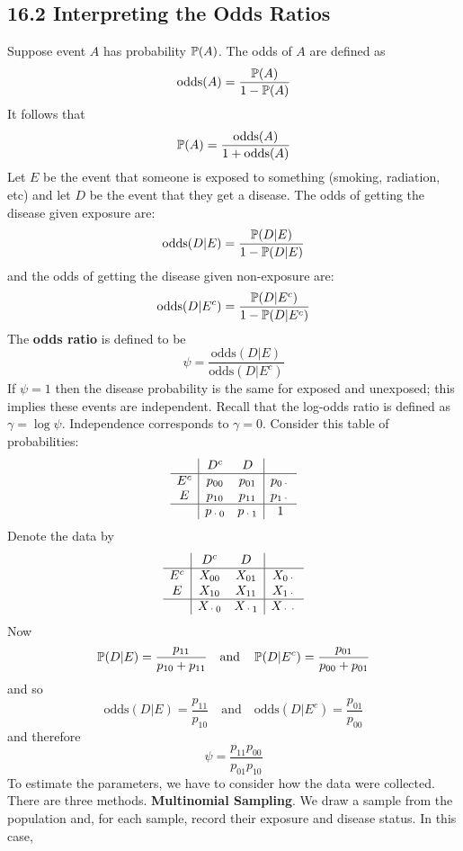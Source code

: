 \subsection*{16.2 Interpreting the Odds
Ratios}\label{interpreting-the-odds-ratios}
Suppose event \(A\) has probability \(\operatorname{\mathbb{P}}(A)\). The odds of \(A\)
are defined as
\[
\text{odds}(A) = \frac{\operatorname{\mathbb{P}}(A)}{1 - \operatorname{\mathbb{P}}(A)}
\]
It follows that
\[
\operatorname{\mathbb{P}}(A) = \frac{\text{odds}(A)}{1 + \text{odds}(A)}
\]
Let \(E\) be the event that someone is exposed to something (smoking,
radiation, etc) and let \(D\) be the event that they get a disease. The
odds of getting the disease given exposure are:
\[
\text{odds}(D | E) = \frac{\operatorname{\mathbb{P}}(D | E)}{1 - \operatorname{\mathbb{P}}(D | E)}
\]
and the odds of getting the disease given non-exposure are:
\[
\text{odds}(D | E^{c}) = \frac{\operatorname{\mathbb{P}}(D | E^{c})}{1 - \operatorname{\mathbb{P}}(D | E^{c})}
\]
The \textbf{odds ratio} is defined to be
\[
\psi = \frac{\text{odds}(D | E)}{\text{odds}(D | E^{c})}
\]
If \(\psi = 1\) then the disease probability is the same for exposed and
unexposed; this implies these events are independent. Recall that the
log-odds ratio is defined as \(\gamma = \log \psi\). Independence
corresponds to \(\gamma = 0\).
Consider this table of probabilities:
\[
\begin{array}{c|cc|c} 
      & D^{c}    & D      & \\
\hline
E^{c}   & p_{00} & p_{01} & p_{0\text{·}}\\
E     & p_{10} & p_{11} & p_{1\text{·}}\\
 \hline
      & p_{\text{·}0} & p_{\text{·}1} & 1
\end{array}
\]
Denote the data by
\[
\begin{array}{c|cc|c} 
      & D^{c}    & D      & \\
\hline
E^{c}   & X_{00} & X_{01} & X_{0\text{·}}\\
E     & X_{10} & X_{11} & X_{1\text{·}}\\
 \hline
      & X_{\text{·}0} & X_{\text{·}1} & X_{\text{··}}
\end{array}
\]
Now
\[
\operatorname{\mathbb{P}}(D | E) = \frac{p_{11}}{p_{10} + p_{11}}
\quad \text{and} \quad
\operatorname{\mathbb{P}}(D | E^{c}) = \frac{p_{01}}{p_{00} + p_{01}}
\]
and so
\[
\text{odds}(D | E) = \frac{p_{11}}{p_{10}}
\quad \text{and} \quad
\text{odds}(D | E^{c}) = \frac{p_{01}}{p_{00}}
\]
and therefore
\[
\psi = \frac{p_{11}p_{00}}{p_{01}p_{10}}
\]
To estimate the parameters, we have to consider how the data were
collected. There are three methods.
\textbf{Multinomial Sampling}. We draw a sample from the population and, for each sample, record their exposure and disease status. In this case, 
